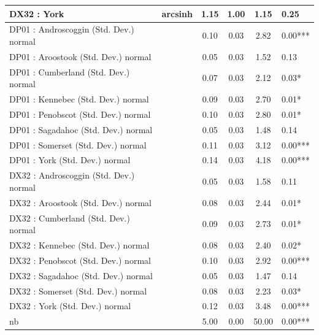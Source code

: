 \begin{table}
\begin{center}
\begin{tabular}{|l|l|c|c|c|l|}
			\hline
			DX32 : York & arcsinh & 1.15 & 1.00 & 1.15 & 0.25 \\
			\hline
			DP01 : Androscoggin (Std. Dev.) normal &  & 0.10 & 0.03 & 2.82 & 0.00*** \\
			\hline
			DP01 : Aroostook (Std. Dev.) normal &  & 0.05 & 0.03 & 1.52 & 0.13 \\
			\hline
			DP01 : Cumberland (Std. Dev.) normal &  & 0.07 & 0.03 & 2.12 & 0.03* \\
			\hline
			DP01 : Kennebec (Std. Dev.) normal &  & 0.09 & 0.03 & 2.70 & 0.01* \\
			\hline
			DP01 : Penobscot (Std. Dev.) normal &  & 0.10 & 0.03 & 2.80 & 0.01* \\
			\hline
			DP01 : Sagadahoc (Std. Dev.) normal &  & 0.05 & 0.03 & 1.48 & 0.14 \\
			\hline
			DP01 : Somerset (Std. Dev.) normal &  & 0.11 & 0.03 & 3.12 & 0.00*** \\
			\hline
			DP01 : York (Std. Dev.) normal &  & 0.14 & 0.03 & 4.18 & 0.00*** \\
			\hline
			DX32 : Androscoggin (Std. Dev.) normal &  & 0.05 & 0.03 & 1.58 & 0.11 \\
			\hline
			DX32 : Aroostook (Std. Dev.) normal &  & 0.08 & 0.03 & 2.44 & 0.01* \\
			\hline
			DX32 : Cumberland (Std. Dev.) normal &  & 0.09 & 0.03 & 2.73 & 0.01* \\
			\hline
			DX32 : Kennebec (Std. Dev.) normal &  & 0.08 & 0.03 & 2.40 & 0.02* \\
			\hline
			DX32 : Penobscot (Std. Dev.) normal &  & 0.10 & 0.03 & 2.92 & 0.00*** \\
			\hline
			DX32 : Sagadahoc (Std. Dev.) normal &  & 0.05 & 0.03 & 1.47 & 0.14 \\
			\hline
			DX32 : Somerset (Std. Dev.) normal &  & 0.08 & 0.03 & 2.23 & 0.03* \\
			\hline
			DX32 : York (Std. Dev.) normal &  & 0.12 & 0.03 & 3.48 & 0.00*** \\
			\hline
			nb &  & 5.00 & 0.00 & 50.00 & 0.00*** \\
			\hline
		\end{tabular}
	\end{center}
\end{table}